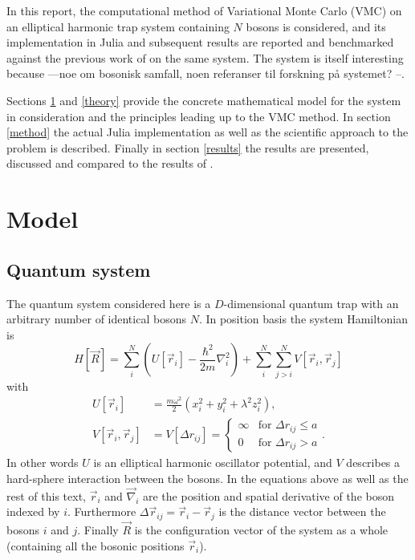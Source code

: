 \documentclass[a4paper,8pt]{article}
\begin{document}
\begin{multicols}{2}
In this report, the computational method of Variational Monte Carlo (VMC) on an elliptical harmonic trap system containing $N$ bosons is considered, and its implementation in Julia and subsequent results are reported and benchmarked against the previous work of \cite{SWL} on the same system. The system is itself interesting because ---noe om bosonisk samfall, noen referanser til forskning på systemet? --. 

Sections \ref{model} and \ref{theory} provide the concrete mathematical model for the system in consideration and the principles leading up to the VMC method. In section \ref{method} the actual Julia implementation as well as the scientific approach to the problem is described. Finally in section \ref{results} the results are presented, discussed and compared to the results of \cite{SWL}.


\section{Model} \label{model}

\subsection{Quantum system}\label{system}
The quantum system considered here is a $D$-dimensional quantum trap with an arbitrary number of identical bosons $N$. In position basis the system Hamiltonian is
\begin{equation}\label{dimHam}
H[\vec{R}] = \sum\limits_i^N \left(U[\vec{r}_i] -\frac{\hbar^2}{2m}\nabla_i^2 \right) + \sum\limits_i^N\sum\limits_{j > i}^N V[\vec{r}_i,\vec{r}_j]
\end{equation}
with
\begin{align}
U[\vec{r}_i] &= \frac{m\omega^2}{2}\left(x_i^2+y_i^2+\lambda^2z_i^2\right), \\
V[\vec{r}_i,\vec{r}_j] &= V[\Delta{r}_{ij}] =\begin{cases} \infty & \text{for $\Delta{r}_{ij} \leq a$} \\
0 & \text{for $\Delta{r}_{ij} > a$} \end{cases}.
\end{align}
In other words $U$ is an elliptical harmonic oscillator potential, and $V$ describes a hard-sphere interaction between the bosons. In the equations above as well as the rest of this text, $\vec{r}_i$ and $\vec{\nabla}_i$ are the position and spatial derivative of the boson indexed by $i$. Furthermore $\Delta\vec{r}_{ij} = \vec{r}_i-\vec{r}_j$ is the distance vector between the bosons $i$ and $j$. Finally $\vec{R}$ is the configuration vector of the system as a whole (containing all the bosonic positions $\vec{r}_i$).


\end{multicols}
\end{document}
